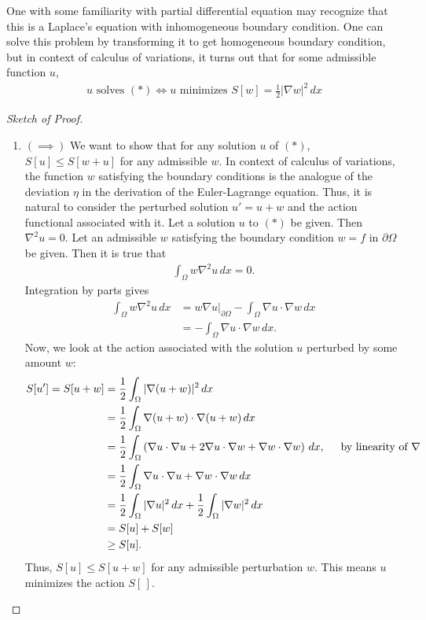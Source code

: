 \documentclass{article}
\newcommand{\p}{\partial}
\newcommand{\f}[2]{\frac{#1}{#2}}
\newcommand{\lp}{\left(}
\newcommand{\rp}{\right)}
\begin{document}
One with some familiarity with partial differential equation may recognize that this is a Laplace's equation with inhomogeneous boundary condition. One can solve this problem by transforming it to get homogeneous boundary condition, but in context of calculus of variations, it turns out that for some admissible function $u$,
\begin{align}\label{laplace}
\boxed{\text{$u$ solves $(\ast)$} \iff \text{$u$ minimizes $S[w] = \frac{1}{2}\vert \nabla w\vert^2\,dx$}} 
\end{align}
\begin{proof}[Sketch of Proof]
	$\,$
	\begin{enumerate}
		\item $(\implies)$ We want to show that for any solution $u$ of $(\ast)$, $S[u] \leq S[w+u]$ for any admissible $w$. In context of calculus of variations, the function $w$ satisfying the boundary conditions is the analogue of the deviation $\eta$ in the derivation of the Euler-Lagrange equation. Thus, it is natural to consider the perturbed solution $u' = u + w$ and the action functional associated with it. Let a solution $u$ to $(\ast)$ be given. Then $\nabla^2u = 0$. Let an admissible $w$ satisfying the boundary condition $w = f$ in $\p \Omega$ be given. Then it is true that
		\begin{align}
		\int_\Omega w\nabla^2 u\,dx = 0.
		\end{align}
		Integration by parts gives
		\begin{align}\label{equal}
		\int_\Omega w\nabla^2 u\,dx &= w\nabla u\bigg\vert_{\p\Omega} - \int_\Omega \nabla u \cdot \nabla w\,dx \nonumber \\
		&= - \int_\Omega \nabla u \cdot \nabla w\,dx.
		\end{align}
		Now, we look at the action associated with the solution $u$ perturbed by some amount $w$: 
		\begin{align}
		S[u'] = S[u+w] &= \f{1}{2}\int_\Omega \vert \nabla(u+w) \vert^2\,dx \nonumber \\
		&=  \f{1}{2}\int_\Omega \nabla(u+w) \cdot \nabla(u+w)\,dx \nonumber \\
		&= \f{1}{2}\int_\Omega \lp\nabla u \cdot \nabla u + 2 \nabla u \cdot \nabla w + \nabla w \cdot \nabla w \rp \,dx\nonumber, \hspace{0.5cm}\text{by linearity of $\nabla$}\\
		&= \f{1}{2}\int_\Omega \nabla u \cdot \nabla u + \nabla w \cdot \nabla w\,dx\nonumber\\
		&= \f{1}{2}\int_\Omega \vert \nabla u \vert^2\,dx + \f{1}{2}\int_\Omega \vert \nabla w \vert^2\,dx\nonumber\\
		&= S[u] + S[w]\nonumber\\
		&\geq S[u].
		\end{align}
		Thus, $S[u] \leq S[u + w]$ for any admissible perturbation $w$. This means $u$ minimizes the action $S[\,]$.
		

\end{enumerate}
\end{proof}
\end{document}
